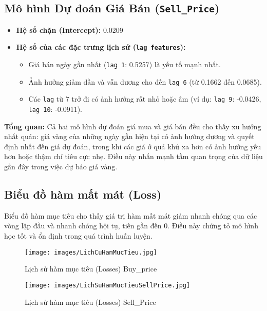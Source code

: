 \documentclass[conference]{IEEEtran}
\begin{document}
\subsection*{Mô hình Dự đoán Giá Bán (\texttt{Sell\_Price})}
\begin{itemize}
    \item \textbf{Hệ số chặn (Intercept):} 0.0209
    \item \textbf{Hệ số của các đặc trưng lịch sử (\texttt{lag features}):}
    \begin{itemize}
        \item Giá bán ngày gần nhất (\texttt{lag 1}: 0.5257) là yếu tố mạnh nhất.
        \item Ảnh hưởng giảm dần và vẫn dương cho đến \texttt{lag 6} (từ 0.1662 đến 0.0685).
        \item Các \texttt{lag} từ 7 trở đi có ảnh hưởng rất nhỏ hoặc âm (ví dụ: \texttt{lag 9}: -0.0426, \texttt{lag 10}: -0.0911).
    \end{itemize}
\end{itemize}

\textbf{Tổng quan:}
Cả hai mô hình dự đoán giá mua và giá bán đều cho thấy xu hướng nhất quán: giá vàng của những ngày gần hiện tại có ảnh hưởng dương và quyết định nhất đến giá dự đoán, trong khi các giá ở quá khứ xa hơn có ảnh hưởng yếu hơn hoặc thậm chí tiêu cực nhẹ. Điều này nhấn mạnh tầm quan trọng của dữ liệu gần đây trong việc dự báo giá vàng.

\subsection*{Biểu đồ hàm mất mát (Loss)}

Biểu đồ hàm mục tiêu cho thấy giá trị hàm mất mát giảm nhanh chóng qua các vòng lặp đầu và nhanh chóng hội tụ, tiến gần đến 0. Điều này chứng tỏ mô hình học tốt và ổn định trong quá trình huấn luyện.

\begin{figure}
    \centering
    \texttt{[image: images/LichCuHamMucTieu.jpg]}
    \caption{Lịch sử hàm mục tiêu (Losses) \- Buy\_price}
    \label{fig:enter-label}
\end{figure}

\begin{figure}
    \centering
    \texttt{[image: images/LichSuHamMucTieuSellPrice.jpg]}
    \caption{Lịch sử hàm mục tiêu (Losses) \- Sell\_Price}
    \label{fig:enter-label}
\end{figure}
\end{document}
